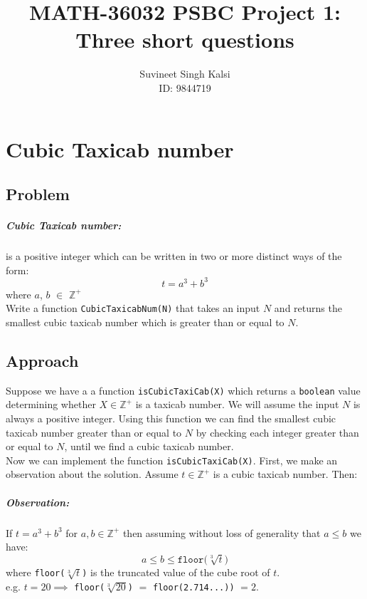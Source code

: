 \documentclass[11pt]{report}
\title{MATH-36032 PSBC Project 1: Three short questions}
\author{Suvineet Singh Kalsi \\ ID: 9844719}
\date{}
\begin{document}

\chapter{Cubic Taxicab number}

\section*{Problem}
\paragraph{Cubic Taxicab number:}
is a positive integer which can be written in two or more distinct ways of the form:
\begin{equation*}
	t = a^3 + b^3
\end{equation*} where $a$, $b$ $\in$ $\mathbb{Z^+}$ \\

Write a function \texttt{CubicTaxicabNum(N)} that takes an input $N$ and returns the smallest cubic taxicab number which is greater than or equal to $N$.

\section{Approach}
Suppose we have a a function \texttt{isCubicTaxiCab(X)} which returns a \texttt{boolean} value determining whether $X \in \mathbb{Z^+}$ is a taxicab number. We will assume the input $N$ is always a positive integer. Using this function we can find the smallest cubic taxicab number greater than or equal to $N$ by checking each integer greater than or equal to $N$, until we find a cubic taxicab number. \\



Now we can implement the function \texttt{isCubicTaxiCab(X)}. First, we make an observation about the solution. Assume $t \in \mathbb{Z^+}$ is a cubic taxicab number. Then:

\paragraph{Observation:}
If $t=a^3+b^3$ for $a, b \in \mathbb{Z^+}$ then assuming without loss of generality that $a \leqslant b$ we have:
\begin{equation*}
	a \leqslant b \leqslant \texttt{floor(}\sqrt[3]{t}\texttt{)} 
\end{equation*} where \texttt{floor($\sqrt[3]{t}$)} is the truncated value of the cube root of $t$. \\ 
e.g. $t=20 \implies$ \texttt{floor($\sqrt[3]{20}$)} $=$ \texttt{floor(2.714...))} $=2$. \\
\end{document}
